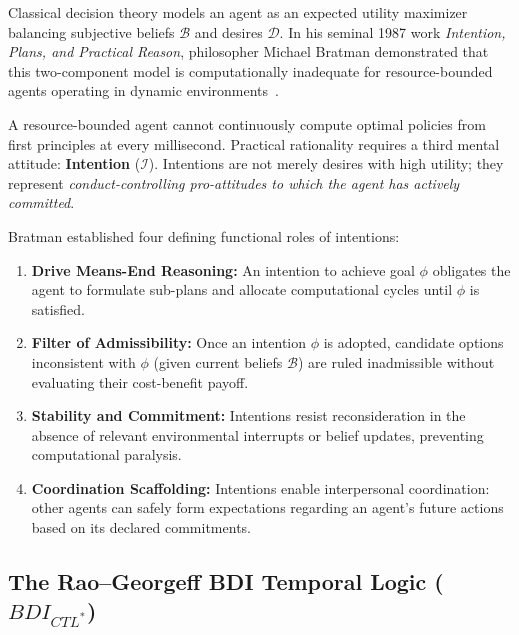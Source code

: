 Classical decision theory models an agent as an expected utility maximizer balancing subjective beliefs $\mathcal{B}$ and desires $\mathcal{D}$. In his seminal 1987 work \emph{Intention, Plans, and Practical Reason}, philosopher Michael Bratman demonstrated that this two-component model is computationally inadequate for resource-bounded agents operating in dynamic environments~.

A resource-bounded agent cannot continuously compute optimal policies from first principles at every millisecond. Practical rationality requires a third mental attitude: \textbf{Intention} ($\mathcal{I}$). Intentions are not merely desires with high utility; they represent \emph{conduct-controlling pro-attitudes to which the agent has actively committed}.

%
Bratman established four defining functional roles of intentions:
\begin{enumerate}[leftmargin=1.8em,itemsep=2pt]
  \item \textbf{Drive Means-End Reasoning:} An intention to achieve goal $\phi$ obligates the agent to formulate sub-plans and allocate computational cycles until $\phi$ is satisfied.
  \item \textbf{Filter of Admissibility:} Once an intention $\phi$ is adopted, candidate options inconsistent with $\phi$ (given current beliefs $\mathcal{B}$) are ruled inadmissible without evaluating their cost-benefit payoff.
  \item \textbf{Stability and Commitment:} Intentions resist reconsideration in the absence of relevant environmental interrupts or belief updates, preventing computational paralysis.
  \item \textbf{Coordination Scaffolding:} Intentions enable interpersonal coordination: other agents can safely form expectations regarding an agent's future actions based on its declared commitments.
\end{enumerate}

\subsection{The Rao--Georgeff BDI Temporal Logic (\texorpdfstring{$BDI_{CTL^*}$}{BDI-CTL*})}

